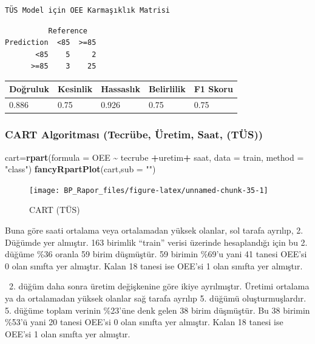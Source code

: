 \documentclass[12pt,twoside]{deuthesis}
\newenvironment{Shaded}{\begin{snugshade}}{\end{snugshade}}
\newcommand{\DataTypeTok}[1]{\textcolor[rgb]{0.13,0.29,0.53}{#1}}
\newcommand{\KeywordTok}[1]{\textcolor[rgb]{0.13,0.29,0.53}{\textbf{#1}}}
\newcommand{\NormalTok}[1]{#1}
\newcommand{\OperatorTok}[1]{\textcolor[rgb]{0.81,0.36,0.00}{\textbf{#1}}}
\newcommand{\StringTok}[1]{\textcolor[rgb]{0.31,0.60,0.02}{#1}}
\begin{document}
\begin{verbatim}
TÜS Model için OEE Karmaşıklık Matrisi 
\end{verbatim}
\begin{verbatim}
          Reference
Prediction  <85  >=85
       <85    5     2
      >=85    3    25
\end{verbatim}
\begin{longtable}[]{@{}lllll@{}}
\toprule
Doğruluk & Kesinlik & Hassaslık & Belirlilik & F1 Skoru\tabularnewline
\midrule
\endhead
0.886 & 0.75 & 0.926 & 0.75 & 0.75\tabularnewline
\bottomrule
\end{longtable}
\hypertarget{cart-algoritmasux131-tecruxfcbe-uxfcretim-saat-tuxfcs}{%
\subsubsection{CART Algoritması (Tecrübe, Üretim, Saat, (TÜS))}\label{cart-algoritmasux131-tecruxfcbe-uxfcretim-saat-tuxfcs}}
\begin{Shaded}
\begin{Highlighting}[]
\NormalTok{cart=}\KeywordTok{rpart}\NormalTok{(}\DataTypeTok{formula =}\NormalTok{ OEE }\OperatorTok{\textasciitilde{}}\StringTok{ }\NormalTok{tecrube }\OperatorTok{+}\NormalTok{uretim}\OperatorTok{+}\StringTok{ }\NormalTok{saat, }\DataTypeTok{data =}\NormalTok{ train, }\DataTypeTok{method =} \StringTok{"class"}\NormalTok{)}
\KeywordTok{fancyRpartPlot}\NormalTok{(cart,}\DataTypeTok{sub =} \StringTok{""}\NormalTok{)}
\end{Highlighting}
\end{Shaded}
\begin{figure}

{\centering \texttt{[image: BP\_Rapor\_files/figure-latex/unnamed-chunk-35-1]} 

}

\caption{CART (TÜS)}\label{fig:unnamed-chunk-35}
\end{figure}
Buna göre saati ortalama veya ortalamadan yüksek olanlar, sol tarafa ayrılıp, 2. Düğümde yer almıştır. 163 birimlik ``train'' verisi üzerinde hesaplandığı için bu 2. düğüme \%36 oranla 59 birim düşmüştür. 59 birimin \%69'u yani 41 tanesi OEE'si 0 olan sınıfta yer almıştır. Kalan 18 tanesi ise OEE'si 1 olan sınıfta yer almıştır.

~2. düğüm daha sonra üretim değişkenine göre ikiye ayrılmıştır. Üretimi ortalama ya da ortalamadan yüksek olanlar sağ tarafa ayrılıp 5. düğümü oluşturmuşlardır. 5. düğüme toplam verinin \%23'üne denk gelen 38 birim düşmüştür. Bu 38 birimin \%53'ü yani 20 tanesi OEE'si 0 olan sınıfta yer almıştır. Kalan 18 tanesi ise OEE'si 1 olan sınıfta yer almıştır.
\end{document}
